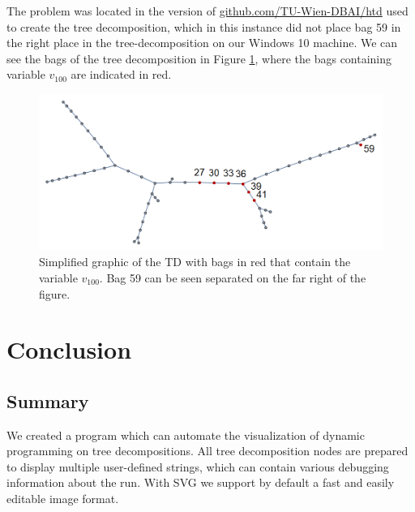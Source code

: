 \documentclass[a4paper, 12pt, bibliography=totoc]{scrartcl}
\begin{document}

The problem was located in the version of \url{github.com/TU-Wien-DBAI/htd} used to create the tree decomposition, which in this instance did not place bag 59 in the right place in the tree-decomposition on our Windows 10 machine. We can see the bags of the tree decomposition in Figure \ref{fig:bag59td}, where the bags containing variable $v_{100}$ are indicated in red. 

\begin{figure}
	\centering
	\includegraphics[width=0.9\linewidth,height=0.9\textheight,keepaspectratio]{images/stars100var100.png}
	\caption[Simplified graphic of the TD with bags in red that contain the variable $v_{100}$]{Simplified graphic of the TD with bags in red that contain the variable $v_{100}$. Bag 59 can be seen separated on the far right of the figure.}
	\label{fig:bag59td}
\end{figure}
\section{Conclusion}\label{sec:conclusion}
\subsection{Summary}
We created a program which can automate the visualization of dynamic programming on tree decompositions. All tree decomposition nodes are prepared to display multiple user-defined strings, which can contain various debugging information about the run.
With SVG we support by default a fast and easily editable image format.\\
\end{document}
